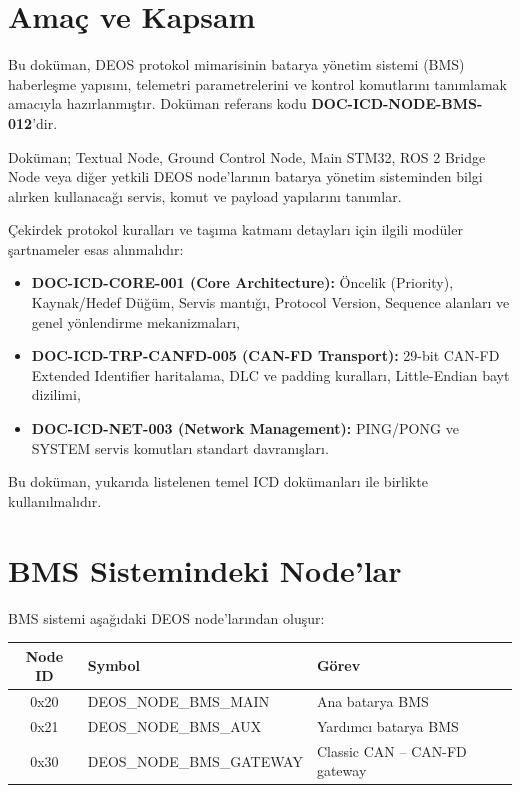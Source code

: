 \documentclass[a4paper,10pt]{article}
\begin{document}
\section{Amaç ve Kapsam}

Bu doküman, DEOS protokol mimarisinin batarya yönetim sistemi (BMS) haberleşme yapısını, telemetri parametrelerini ve kontrol komutlarını tanımlamak amacıyla hazırlanmıştır. Doküman referans kodu \textbf{DOC-ICD-NODE-BMS-012}'dir.

Doküman; Textual Node, Ground Control Node, Main STM32,
ROS 2 Bridge Node veya diğer yetkili DEOS node'larının batarya yönetim
sisteminden bilgi alırken kullanacağı servis, komut ve payload
yapılarını tanımlar.

Çekirdek protokol kuralları ve taşıma katmanı detayları için ilgili modüler şartnameler esas alınmalıdır:
\begin{itemize}
    \item \textbf{DOC-ICD-CORE-001 (Core Architecture):} Öncelik (Priority), Kaynak/Hedef Düğüm, Servis mantığı, Protocol Version, Sequence alanları ve genel yönlendirme mekanizmaları,
    \item \textbf{DOC-ICD-TRP-CANFD-005 (CAN-FD Transport):} 29-bit CAN-FD Extended Identifier haritalama, DLC ve padding kuralları, Little-Endian bayt dizilimi,
    \item \textbf{DOC-ICD-NET-003 (Network Management):} PING/PONG ve SYSTEM servis komutları standart davranışları.
\end{itemize}

Bu doküman, yukarıda listelenen temel ICD dokümanları ile birlikte kullanılmalıdır.

\section{BMS Sistemindeki Node'lar}

BMS sistemi aşağıdaki DEOS node'larından oluşur:

\begin{center}
\begin{tabular}{c l l}
\toprule
\textbf{Node ID} & \textbf{Symbol} & \textbf{Görev} \\
\midrule

0x20 &
DEOS\_NODE\_BMS\_MAIN &
Ana batarya BMS \\

0x21 &
DEOS\_NODE\_BMS\_AUX &
Yardımcı batarya BMS \\

0x30 &
DEOS\_NODE\_BMS\_GATEWAY &
Classic CAN -- CAN-FD gateway \\

\bottomrule
\end{tabular}
\end{center}
\end{document}
